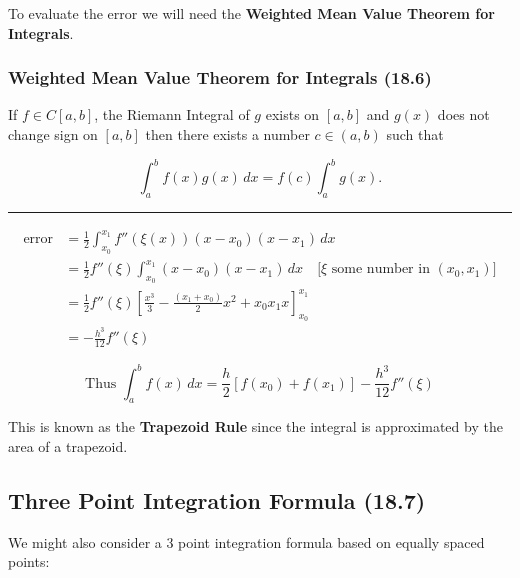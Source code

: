 To evaluate the error we will need the \textbf{Weighted Mean Value Theorem for
Integrals}.

\subsubsection{Weighted Mean Value Theorem for Integrals (18.6)}\label{sec:weighted_mean_value_theorem}

If $f\in C[a,b]$, the Riemann Integral of $g$ exists on $[a,b]$ and $g(x)$ does
not change sign on $[a,b]$ then there exists a number $c \in (a,b)$ such that

\[
  \int_a^b f(x) g(x) \, dx = f(c) \int_a^b g(x) 
.\]

\hrule

\begin{align*}
  \text{error} &= \frac{1}{2}\int_{x_0}^{x_1} f''\left(\xi(x)\right)(x - x_0)(x - x_1)\,dx \\
               &= \frac{1}{2} f''(\xi)\int_{x_0}^{x_1}(x - x_0)(x - x_1)\,dx \quad\text{[$\xi$ some number in $(x_0,x_1)$]}\\[6pt]
               &= \frac{1}{2}f''(\xi)\left[\frac{x^3}{3}-\frac{(x_1 + x_0)}{2}x^2+x_0x_1 x\right]_{x_0}^{x_1}\\[6pt]
               &= -\frac{h^3}{12}f''(\xi)
\end{align*}


\[
  \text{Thus } \boxed{
    \int_a^b f(x) \, dx = \frac{h}{2} \left[f(x_0) + f(x_1)\right] -
    \frac{h^3}{12} f''(\xi)
  }
\]

This is known as the \textbf{Trapezoid Rule} since the integral is approximated
by the area of a trapezoid.

\subsection{Three Point Integration Formula (18.7)}\label{sec:three_point_integration}
We might also consider a 3 point integration formula based on equally spaced
points:

